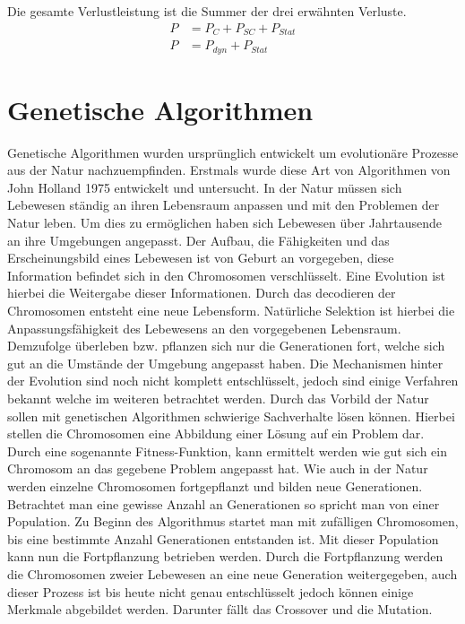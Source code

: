 Die gesamte Verlustleistung ist die Summer der drei erwähnten Verluste.
\begin{equation}
\begin{aligned}
P &= P_{ C }+P_{ SC }+P_{ Stat}\\
P &= P_{dyn}+P_{Stat}
\label{eq:verlustleistung}
\end{aligned}
\end{equation}

\section{Genetische Algorithmen}
\label{sec:genetischer_algo}
Genetische Algorithmen wurden ursprünglich entwickelt um evolutionäre Prozesse aus der Natur nachzuempfinden. Erstmals wurde diese Art von Algorithmen von John Holland 1975 entwickelt und untersucht.
In der Natur müssen sich Lebewesen ständig an ihren Lebensraum anpassen und mit den Problemen der Natur leben. Um dies zu ermöglichen haben sich Lebewesen über Jahrtausende an ihre Umgebungen angepasst. Der Aufbau, die Fähigkeiten und das Erscheinungsbild eines Lebewesen ist von Geburt an vorgegeben, diese Information befindet sich in den Chromosomen verschlüsselt. Eine Evolution ist hierbei die Weitergabe dieser Informationen. Durch das decodieren der Chromosomen entsteht eine neue Lebensform.
Natürliche Selektion ist hierbei die Anpassungsfähigkeit des Lebewesens an den vorgegebenen Lebensraum. Demzufolge überleben bzw. pflanzen sich nur die Generationen fort, welche sich gut an die Umstände der Umgebung angepasst haben. Die Mechanismen hinter der Evolution sind noch nicht komplett entschlüsselt, jedoch sind einige Verfahren bekannt welche im weiteren betrachtet werden.
Durch das Vorbild der Natur sollen mit genetischen Algorithmen schwierige Sachverhalte lösen können. Hierbei stellen die Chromosomen eine Abbildung einer Lösung auf ein Problem dar. Durch eine sogenannte Fitness-Funktion, kann ermittelt werden wie gut sich ein Chromosom an das gegebene Problem angepasst hat. Wie auch in der Natur werden einzelne Chromosomen fortgepflanzt und bilden neue Generationen. Betrachtet man eine gewisse Anzahl an Generationen so spricht man von einer Population. Zu Beginn des Algorithmus startet man mit zufälligen Chromosomen, bis eine bestimmte Anzahl Generationen entstanden ist. Mit dieser Population kann nun die Fortpflanzung betrieben werden.
Durch die Fortpflanzung werden die Chromosomen zweier Lebewesen an eine neue Generation weitergegeben, auch dieser Prozess ist bis heute nicht genau entschlüsselt jedoch können einige Merkmale abgebildet werden. Darunter fällt das Crossover und die Mutation.\cite{davis1991handbook}

